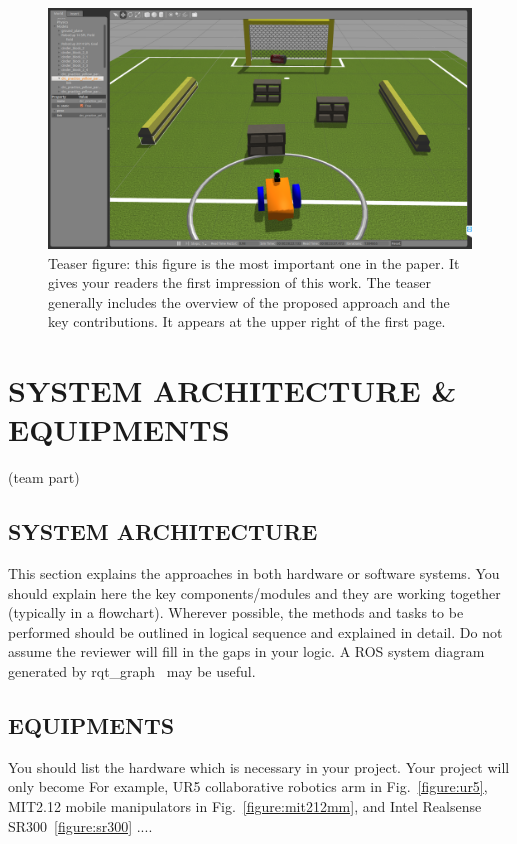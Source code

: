 \documentclass[letterpaper, 10 pt, conference]{ieeeconf}  %
\begin{document}
\begin{figure}[t]
\includegraphics[width=0.95\columnwidth]{gazebo_view}
\centering
\caption{Teaser figure: this figure is the most important one in the paper. It gives your readers the first impression of this work. The teaser generally includes the overview of the proposed approach and the key contributions. It appears at the upper right of the first page.}
\end{figure}

\section{SYSTEM ARCHITECTURE \& EQUIPMENTS}

(team part)

\subsection{SYSTEM ARCHITECTURE}

This section explains the approaches in both hardware or software systems. You should explain here the key components/modules and they are working together (typically in a flowchart). Wherever possible, the methods and tasks to be performed should be outlined in logical sequence and explained in detail. Do not assume the reviewer will fill in the gaps in your logic. A ROS system diagram generated by rqt\_graph~\cite{rqt-graph} may be useful.

\subsection{EQUIPMENTS} 

You should list the hardware which is necessary in your project. Your project will only become For example, UR5 collaborative robotics arm in Fig.~\ref{figure:ur5}, MIT2.12 mobile manipulators in Fig.~\ref{figure:mit212mm}, and Intel Realsense SR300~\ref{figure:sr300} ....
\end{document}
